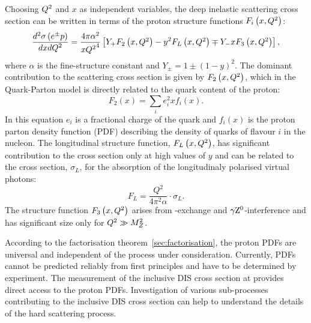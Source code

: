 Choosing $\mbox{${Q^2}$}$ and $x$ as independent variables, the deep inelastic scattering cross section can be written in terms of the proton structure functions $F_i\left(x,\mbox{${Q^2}$}\right)$:
\begin{equation}
\frac{d^2\sigma\left( e^\pm p \right) }{dxd\mbox{${Q^2}$}} = \frac{4\pi\alpha^2}{x\mbox{${Q^2}$}^4}\left[ Y_+F_2\left(x,\mbox{${Q^2}$}\right) - y^2F_L\left(x,\mbox{${Q^2}$}\right) \mp Y_-xF_3\left(x,\mbox{${Q^2}$}\right) \right],
\label{eq:ddifDIS}
\end{equation}
where $\alpha$ is the fine-structure constant and $Y_\pm = 1 \pm \left( 1 - y \right)^2$. The dominant contribution to the scattering cross section is given by $F_2\left(x,\mbox{${Q^2}$}\right)$, which in the Quark-Parton model is directly related to the quark content of the proton:
\begin{equation}
F_2\left(x\right) = \sum_i{e_i^2xf_i\left(x\right)}.
\label{eq:f2pdf}
\end{equation}
In this equation $e_i$ is a fractional charge of the quark and $f_i\left(x\right)$ is the proton parton density function (PDF) describing the density of quarks of flavour $i$ in the nucleon. The longitudinal structure function, $F_L\left(x,\mbox{${Q^2}$}\right)$, has significant contribution to the cross section only at high values of $y$ and can be related to the cross section, $\sigma_L$, for the absorption of the longitudinaly polarised virtual photons:
\begin{equation}
F_L = \frac{Q^2}{4\pi^2\alpha}\cdot \sigma_L.
\label{eq:sigmal}
\end{equation}
The structure function $F_3\left(x,\mbox{${Q^2}$}\right)$ arises from \zn-exchange and $\gamma\mbox{$\rm{Z}^0$}$-interference and has significant size only for $\mbox{${Q^2}$} \gg M^2_Z$.

According to the factorisation theorem~\ref{sec:factorisation}, the proton PDFs are universal and independent of the process under consideration. Currently, PDFs cannot be predicted reliably from first principles and have to be determined by experiment. The measurement of the inclusive DIS cross section at \hera provides direct access to the proton PDFs. Investigation of various sub-processes contributing to the inclusive DIS cross section can help to understand the details of the hard scattering process.
